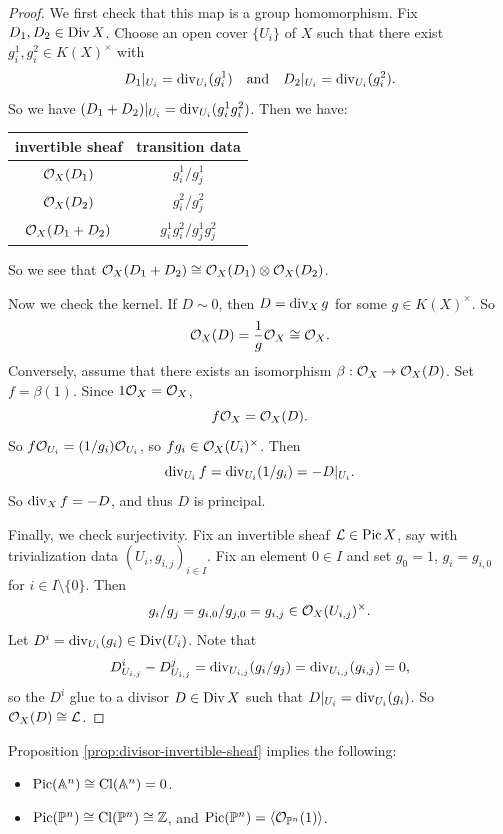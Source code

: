 \begin{proof}
  We first check that this map is a
  group homomorphism. Fix
  $D_1, D_2 \in \operatorname{Div} X$. Choose an open cover
  $\{U_i\}$ of $X$ such that there exist
  $g_i^1, g_i^2 \in K(X)^\times$ with
  \[
    D_1|_{U_i} = \operatorname{div}_{U_i}(g_i^1)
    \quad \text{and} \quad
    D_2|_{U_i} = \operatorname{div}_{U_i}(g_i^2).
  \]
  So we have $(D_1 + D_2)|_{U_i}
  = \operatorname{div}_{U_i}(g_i^1 g_i^2)$.
  Then we have:
  \begin{center}
    \begin{tabular}{c|c}
      invertible sheaf & transition data \\
      \hline
      $\mathcal{O}_X(D_1)$ & $g_i^1 / g_j^1$ \\
      $\mathcal{O}_X(D_2)$ & $g_i^2 / g_j^2$ \\
      $\mathcal{O}_X(D_1 + D_2)$ & $g_i^1 g_i^2 / g_j^1 g_j^2$
    \end{tabular}
  \end{center}
  So we see that $\mathcal{O}_X(D_1 + D_2) \cong
  \mathcal{O}_X(D_1) \otimes \mathcal{O}_X(D_2)$.

  Now we check the kernel.
  If $D \sim 0$, then $D = \operatorname{div}_X g$
  for some $g \in K(X)^\times$. So
  \[
    \mathcal{O}_X(D) = \frac{1}{g} \mathcal{O}_X \cong \mathcal{O}_X.
  \]
  Conversely, assume that there exists an
  isomorphism
  $\beta : \mathcal{O}_X \to \mathcal{O}_X(D)$.
  Set $f = \beta(1)$. Since
  $1 \mathcal{O}_X = \mathcal{O}_X$,
  \[
    f \mathcal{O}_X = \mathcal{O}_X(D).
  \]
  So $f \mathcal{O}_{U_i} = (1 / g_i) \mathcal{O}_{U_i}$,
  so $f g_i \in \mathcal{O}_X(U_i)^\times$.
  Then
  \[\operatorname{div}_{U_i} f =
  \operatorname{div}_{U_i}(1 / g_i) = -D|_{U_i}.\]
  So $\operatorname{div}_X f = -D$, and thus
  $D$ is principal.

  Finally, we check surjectivity.
  Fix an invertible sheaf
  $\mathcal{L} \in \operatorname{Pic} X$, say with
  trivialization data
  $(U_i, g_{i, j})_{i \in I}$. Fix an element
  $0 \in I$ and set $g_0 = 1$,
  $g_i = g_{i, 0}$ for $i \in I \setminus \{0\}$.
  Then
  \[
    g_i / g_j
    = g_{i, 0} / g_{j, 0}
    = g_{i, j} \in \mathcal{O}_X(U_{i, j})^\times.
  \]
  Let $D^i = \operatorname{div}_{U_i}(g_i) \in \operatorname{Div}(U_i)$.
  Note that
  \[
    D^i_{U_{i, j}}
    - D^j_{U_{i, j}}
    = \operatorname{div}_{U_{i, j}}(g_i / g_j)
    = \operatorname{div}_{U_{i, j}}(g_{i, j}) = 0,
  \]
  so the $D^i$ glue to a divisor
  $D \in \operatorname{Div} X$ such that
  $D|_{U_i} = \operatorname{div}_{U_i}(g_i)$.
  So $\mathcal{O}_X(D) \cong \mathcal{L}$.
\end{proof}

\begin{remark}
  Proposition \ref{prop:divisor-invertible-sheaf}
  implies the following:
  \begin{itemize}
    \item $\operatorname{Pic}(\mathbb{A}^n) \cong \operatorname{Cl}(\mathbb{A}^n) = 0$.
    \item $\operatorname{Pic}(\mathbb{P}^n) \cong \operatorname{Cl}(\mathbb{P}^n)
      \cong \mathbb{Z}$,
      and $\operatorname{Pic}(\mathbb{P}^n) = \langle \mathcal{O}_{\mathbb{P}^n}(1) \rangle$.
  \end{itemize}
\end{remark}

